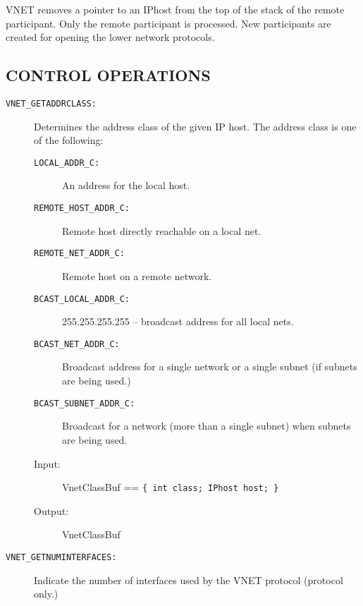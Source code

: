 VNET removes a pointer to an IPhost from the top of the stack of the
remote participant.  Only the remote participant is processed.  New
participants are created for opening the lower network protocols.

\subsection*{CONTROL OPERATIONS}

\begin{description}

\item[{\tt VNET\_GETADDRCLASS:}]

Determines the address class of the given IP host.  The address class
is one of the following:

\begin{description}
\item[{\tt LOCAL\_ADDR\_C:}]
	An address for the local host.

\item[{\tt REMOTE\_HOST\_ADDR\_C:}]
	Remote host directly reachable on a local net.

\item[{\tt REMOTE\_NET\_ADDR\_C:}]
	Remote host on a remote network.

\item[{\tt BCAST\_LOCAL\_ADDR\_C:}]
	255.255.255.255 -- broadcast address for all local nets.

\item[{\tt BCAST\_NET\_ADDR\_C:}]
	Broadcast address for a single network or a single subnet (if
	subnets are being used.)

\item[{\tt BCAST\_SUBNET\_ADDR\_C:}]
	Broadcast for a network (more than a single subnet) when
	subnets are being used.

\end{description}

\begin{description}
\item[{\rm Input:}] { VnetClassBuf == \tt \{ int class; IPhost host; \} }
\item[{\rm Output:}] VnetClassBuf 
\end{description}



\item[{\tt VNET\_GETNUMINTERFACES:}]

Indicate the number of interfaces used by the VNET protocol (protocol only.)


\end{description}
